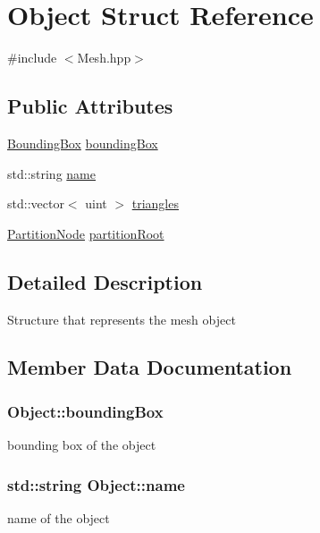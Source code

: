 \hypertarget{struct_object}{}\section{Object Struct Reference}
\label{struct_object}


{\ttfamily \#include $<$Mesh.\+hpp$>$}

\subsection*{Public Attributes}
\begin{DoxyCompactItemize}
\item 
\hyperlink{struct_bounding_box}{Bounding\+Box} \hyperlink{struct_object_aeeac86f3158968433d8484fb43dc9727}{bounding\+Box}
\item 
std\+::string \hyperlink{struct_object_a24457e0a387492c80594aec7681a2277}{name}
\item 
std\+::vector$<$ uint $>$ \hyperlink{struct_object_a4a7a34b417ea8969e1407e6962c671eb}{triangles}
\item 
\hyperlink{struct_partition_node}{Partition\+Node} \hyperlink{struct_object_a484e6471a6620c2dd98aa3db6ab7a9f5}{partition\+Root}
\end{DoxyCompactItemize}


\subsection{Detailed Description}
Structure that represents the mesh object 

\subsection{Member Data Documentation}
\hypertarget{struct_object_aeeac86f3158968433d8484fb43dc9727}{}
\subsubsection[{bounding\+Box}]{ Object\+::bounding\+Box}\label{struct_object_aeeac86f3158968433d8484fb43dc9727}
bounding box of the object \hypertarget{struct_object_a24457e0a387492c80594aec7681a2277}{}
\subsubsection[{name}]{\setlength{\rightskip}{0pt plus 5cm}std\+::string Object\+::name}\label{struct_object_a24457e0a387492c80594aec7681a2277}
name of the object \hypertarget{struct_object_a484e6471a6620c2dd98aa3db6ab7a9f5}{}

